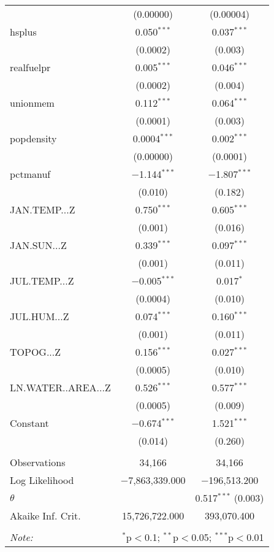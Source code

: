 \begin{table}[!htbp]
\begin{tabular}{@{\extracolsep{5pt}}lcc}
  & (0.00000) & (0.00004) \\ 
  hsplus & 0.050$^{***}$ & 0.037$^{***}$ \\ 
  & (0.0002) & (0.003) \\ 
  realfuelpr & 0.005$^{***}$ & 0.046$^{***}$ \\ 
  & (0.0002) & (0.004) \\ 
  unionmem & 0.112$^{***}$ & 0.064$^{***}$ \\ 
  & (0.0001) & (0.003) \\ 
  popdensity & 0.0004$^{***}$ & 0.002$^{***}$ \\ 
  & (0.00000) & (0.0001) \\ 
  pctmanuf & $-$1.144$^{***}$ & $-$1.807$^{***}$ \\ 
  & (0.010) & (0.182) \\ 
  JAN.TEMP...Z & 0.750$^{***}$ & 0.605$^{***}$ \\ 
  & (0.001) & (0.016) \\ 
  JAN.SUN...Z & 0.339$^{***}$ & 0.097$^{***}$ \\ 
  & (0.001) & (0.011) \\ 
  JUL.TEMP...Z & $-$0.005$^{***}$ & 0.017$^{*}$ \\ 
  & (0.0004) & (0.010) \\ 
  JUL.HUM...Z & 0.074$^{***}$ & 0.160$^{***}$ \\ 
  & (0.001) & (0.011) \\ 
  TOPOG...Z & 0.156$^{***}$ & 0.027$^{***}$ \\ 
  & (0.0005) & (0.010) \\ 
  LN.WATER..AREA...Z & 0.526$^{***}$ & 0.577$^{***}$ \\ 
  & (0.0005) & (0.009) \\ 
  Constant & $-$0.674$^{***}$ & 1.521$^{***}$ \\ 
  & (0.014) & (0.260) \\ 
 \hline \\[-1.8ex] 
Observations & 34,166 & 34,166 \\ 
Log Likelihood & $-$7,863,339.000 & $-$196,513.200 \\ 
$\theta$ &  & 0.517$^{***}$  (0.003) \\ 
Akaike Inf. Crit. & 15,726,722.000 & 393,070.400 \\ 
\hline 
\hline \\[-1.8ex] 
\textit{Note:}  & \multicolumn{2}{r}{$^{*}$p$<$0.1; $^{**}$p$<$0.05; $^{***}$p$<$0.01} \\ 
\end{tabular} 
\end{table} 
